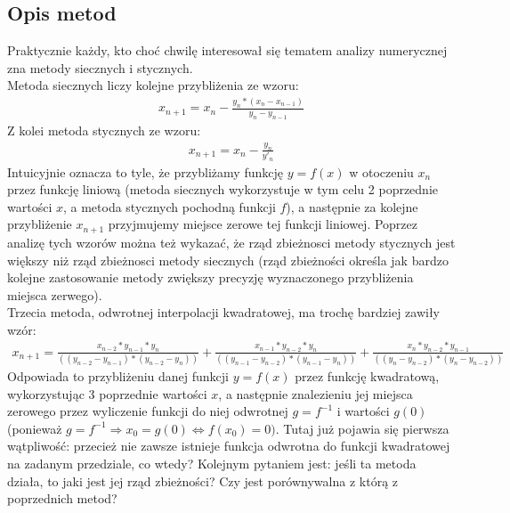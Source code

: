 \documentclass[11pt,wide]{mwart}
\begin{document}
\subsection{Opis metod}
Praktycznie każdy, kto choć chwilę interesował się tematem analizy numerycznej zna metody siecznych i stycznych.\\
\indent Metoda siecznych liczy kolejne przybliżenia ze wzoru:
\begin{gather}
  x_{n+1} = x_{n} - \frac{y_{n}*(x_{n} - x_{n-1})}{y_{n} - y_{n-1}}
\end{gather}
\indent Z kolei metoda stycznych ze wzoru:
\begin{gather}
  x_{n+1} = x_{n} - \frac{y_{n}}{y'_{n}}
\end{gather}
\indent Intuicyjnie oznacza to tyle, że przybliżamy funkcję $y=f(x)$ w otoczeniu $x_{n}$ przez funkcję liniową (metoda siecznych wykorzystuje w tym celu 2 poprzednie wartości $x$, a metoda stycznych pochodną funkcji $f$), a następnie za kolejne przybliżenie $x_{n+1}$ przyjmujemy miejsce zerowe tej funkcji liniowej. Poprzez analizę tych wzorów można też wykazać, że rząd zbieżnosci metody stycznych jest większy niż rząd zbieżnosci metody siecznych (rząd zbieżności określa jak bardzo kolejne zastosowanie metody zwiększy precyzję wyznaczonego przybliżenia miejsca zerwego).\\
\indent Trzecia metoda, odwrotnej interpolacji kwadratowej, ma trochę bardziej zawiły wzór:
\begin{gather}
  x_{n+1} = \frac{x_{n-2}*y_{n-1}*y_{n}}{((y_{n-2}-y_{n-1})*(y_{n-2}-y_{n}))} + \frac{x_{n-1}*y_{n-2}*y_{n}}{((y_{n-1}-y_{n-2})*(y_{n-1}-y_{n}))} + \frac{x_{n}*y_{n-2}*y_{n-1}}{((y_{n}-y_{n-2})*(y_{n}-y_{n-2}))}
\end{gather}
\indent Odpowiada to przybliżeniu danej funkcji $y=f(x)$ przez funkcję kwadratową, wykorzystując 3 poprzednie wartości $x$, a następnie znalezieniu jej miejsca zerowego przez wyliczenie funkcji do niej odwrotnej $g = f^{-1}$ i wartości $g(0)$ (ponieważ $g = f^{-1} \Rightarrow x_0 = g(0) \Leftrightarrow f(x_0) = 0)$. Tutaj już pojawia się pierwsza wątpliwość: przecież nie zawsze istnieje funkcja odwrotna do funkcji kwadratowej na zadanym przedziale, co wtedy? Kolejnym pytaniem jest: jeśli ta metoda działa, to jaki jest jej rząd zbieżności? Czy jest porównywalna z którą z poprzednich metod?
\end{document}
